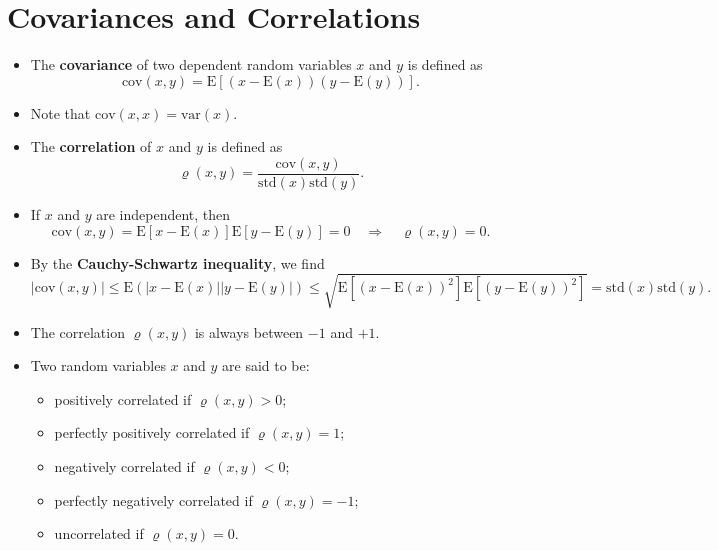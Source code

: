 \section{Covariances and Correlations}

\begin{itemize}[label=\textbullet]
    \item The \textbf{covariance} of two dependent random variables \( x \) and \( y \) is defined as
    \[
    \text{cov}(x, y) = \text{E}[(x - \text{E}(x))(y - \text{E}(y))].
    \]
    \item Note that \(\text{cov}(x, x) = \text{var}(x)\).
    \item The \textbf{correlation} of \( x \) and \( y \) is defined as
    \[
    \varrho(x, y) = \frac{\text{cov}(x, y)}{\text{std}(x) \text{std}(y)}.
    \]
    \item If \( x \) and \( y \) are independent, then
    \[
    \text{cov}(x, y) = \text{E}[x - \text{E}(x)]\text{E}[y - \text{E}(y)] = 0 \quad \Rightarrow \quad \varrho(x, y) = 0.
    \]
\end{itemize}



\begin{itemize}[label=\textbullet]
    \item By the \textbf{Cauchy-Schwartz inequality}, we find
    \[
    |\text{cov}(x, y)| \leq \text{E}(|x - \text{E}(x)||y - \text{E}(y)|) \leq \sqrt{\text{E}[(x - \text{E}(x))^2] \text{E}[(y - \text{E}(y))^2]} = \text{std}(x) \text{std}(y).
    \]
    \item The correlation \(\varrho(x, y)\) is always between \(-1\) and \(+1\).
    \item Two random variables \( x \) and \( y \) are said to be:
    \begin{itemize}
        \item positively correlated if \( \varrho(x, y) > 0 \);
        \item perfectly positively correlated if \( \varrho(x, y) = 1 \);
        \item negatively correlated if \( \varrho(x, y) < 0 \);
        \item perfectly negatively correlated if \( \varrho(x, y) = -1 \);
        \item uncorrelated if \( \varrho(x, y) = 0 \).
    \end{itemize}
\end{itemize}



